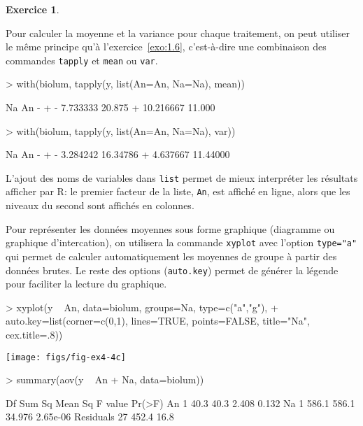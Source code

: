 \documentclass[11pt]{report}
\theoremstyle{definition}
\newtheorem{exo}{Exercice}[chapter]
\newcommand{\R}{\textsf{R}\xspace}
\begin{document}
\begin{exo}
\begin{sol}
Pour calculer la moyenne et la variance pour chaque traitement, on peut
utiliser le même principe qu'à l'exercice~\ref{exo:1.6}, c'est-à-dire une
combinaison des commandes \texttt{tapply} et \texttt{mean} ou \texttt{var}. 
\begin{Schunk}
\begin{Sinput}
> with(biolum, tapply(y, list(An=An, Na=Na), mean))
\end{Sinput}
\begin{Soutput}
   Na
An          -      +
  -  7.733333 20.875
  + 10.216667 11.000
\end{Soutput}
\begin{Sinput}
> with(biolum, tapply(y, list(An=An, Na=Na), var))
\end{Sinput}
\begin{Soutput}
   Na
An         -        +
  - 3.284242 16.34786
  + 4.637667 11.44000
\end{Soutput}
\end{Schunk}
L'ajout des noms de variables dans \texttt{list} permet de mieux interpréter
les résultats afficher par \R : le premier facteur de la liste, \texttt{An},
est affiché en ligne, alors que les niveaux du second sont affichés en
colonnes. 

Pour représenter les données moyennes sous forme graphique (diagramme ou
graphique d'intercation), on utilisera la commande \texttt{xyplot} avec
l'option \verb|type="a"| qui permet de calculer automatiquement les moyennes
de groupe à partir des données brutes. Le reste des options
(\texttt{auto.key}) permet de générer la légende pour faciliter la lecture
du graphique.
\begin{Schunk}
\begin{Sinput}
> xyplot(y ~ An, data=biolum, groups=Na, type=c("a","g"), 
+        auto.key=list(corner=c(0,1), lines=TRUE, points=FALSE, title="Na", cex.title=.8))
\end{Sinput}
\end{Schunk}
\texttt{[image: figs/fig-ex4-4c]}

\begin{Schunk}
\begin{Sinput}
> summary(aov(y ~ An + Na, data=biolum))
\end{Sinput}
\begin{Soutput}
            Df Sum Sq Mean Sq F value   Pr(>F)
An           1   40.3    40.3   2.408    0.132
Na           1  586.1   586.1  34.976 2.65e-06
Residuals   27  452.4    16.8                 
\end{Soutput}
\end{Schunk}


\end{sol}
\end{exo}
\end{document}
